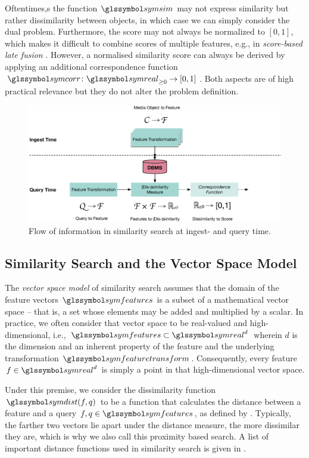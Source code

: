 Oftentimes,s the function $\symsim$ may not express similarity but rather dissimilarity between objects, in which case we can simply consider the dual problem. Furthermore, the score may not always be normalized to $[0, 1]$, which makes it difficult to combine scores of multiple features, e.g., in \emph{score-based late fusion} \cite{Depeursinge:2010Fusion,Rossetto:2018Multi}. However, a normalised similarity score can always be derived by applying an additional correspondence function $\symcorr \colon \symreal_{\geq 0} \rightarrow [0, 1]$. Both aspects are of high practical relevance but they do not alter the problem definition. 

\begin{figure}[tb]
    \centering
    \includegraphics[width=\textwidth]{figures/multimedia-retrieval-pipeline}
    \caption{Flow of information in similarity search at ingest- and query time.}
    \label{figure:multimedia_retrieval_flow}
\end{figure}

\subsection{Similarity Search and the Vector Space Model}

The \emph{vector space model} of similarity search assumes that the domain of the feature vectors $\symfeatures$ is a subset of a mathematical vector space -- that is, a set whose elements may be added and multiplied by a scalar. In practice, we often consider that vector space to be real-valued and high-dimensional, i.e., $\symfeatures \subset \symreal^{d}$ wherein $d$ is the dimension and an inherent property of the feature and the underlying transformation $\symfeaturetransform$. Consequently, every feature $f \in \symreal^{d}$ is simply a point in that high-dimensional vector space.

Under this premise, we consider the dissimilarity function $\symdist(f,q)$ to be a function that calculates the distance between a feature and a query $f,q \in \symfeatures$, as defined by . Typically, the farther two vectors lie apart under the distance measure, the more dissimilar they are, which is why we also call this proximity based search. A list of important distance functions used in similarity search is given in . 

